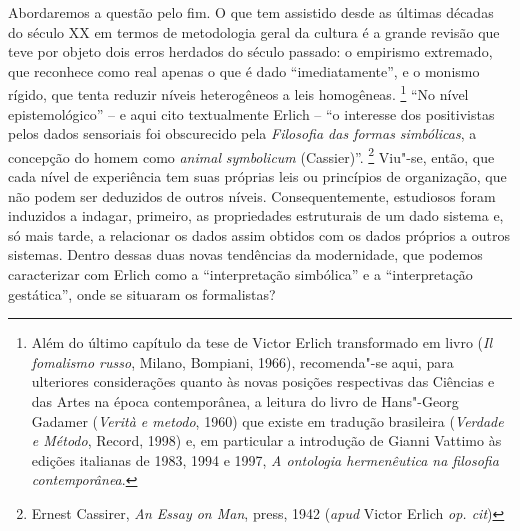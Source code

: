Abordaremos a questão pelo fim. O que tem assistido desde as últimas
décadas do século XX em termos de metodologia geral da cultura é a
grande revisão que teve por objeto dois erros herdados do século
passado: o empirismo extremado, que reconhece como real apenas o que é
dado ``imediatamente'', e o monismo rígido, que tenta reduzir níveis
heterogêneos a leis homogêneas. \footnote{Além do último capítulo da
  tese de Victor Erlich transformado em livro (\emph{Il fomalismo
  russo}, Milano, Bompiani, 1966), recomenda"-se aqui, para ulteriores
  considerações quanto às novas posições respectivas das Ciências e das
  Artes na época contemporânea, a leitura do livro de Hans"-Georg Gadamer
  (\emph{Verità e metodo}, 1960) que existe em tradução brasileira
  (\emph{Verdade e Método}, Record, 1998) e, em particular a introdução
  de Gianni Vattimo às edições italianas de 1983, 1994 e 1997, \emph{A
  ontologia hermenêutica na filosofia contemporânea}.} ``No nível
epistemológico'' -- e aqui cito textualmente Erlich -- ``o interesse dos
positivistas pelos dados sensoriais foi obscurecido pela \emph{Filosofia
das formas simbólicas}, a concepção do homem como \emph{animal}
\emph{symbolicum} (Cassier)''. \footnote{Ernest Cassirer, \emph{An Essay
  on Man}, press, 1942 (\emph{apud} Victor Erlich \emph{op. cit})}
Viu"-se, então, que cada nível de experiência tem suas próprias leis ou
princípios de organização, que não podem ser deduzidos de outros níveis.
Consequentemente, estudiosos foram induzidos a indagar, primeiro, as
propriedades estruturais de um dado sistema e, só mais tarde, a
relacionar os dados assim obtidos com os dados próprios a outros
sistemas. Dentro dessas duas novas tendências da modernidade, que
podemos caracterizar com Erlich como a ``interpretação simbólica'' e a
``interpretação gestática'', onde se situaram os formalistas?

